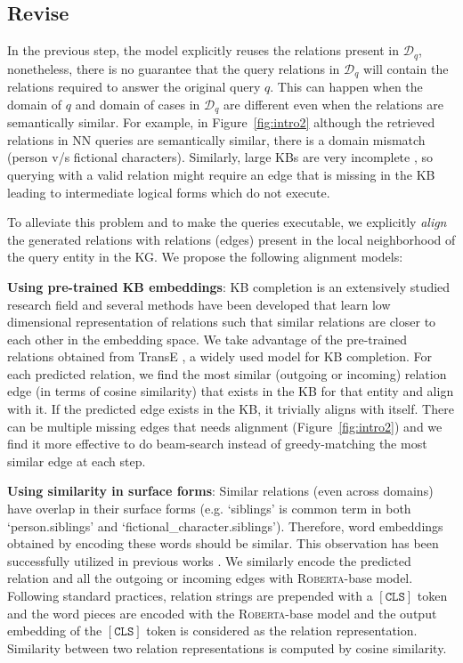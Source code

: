 \documentclass[11pt]{article}
\newcommand{\roberta}{\textsc{Roberta}\xspace}
\begin{document}
\subsection{Revise}
\label{sub:revise}

In the previous step, the model explicitly reuses the relations present in $\mathcal{D}_q$, nonetheless, there is no guarantee that the query relations in $\mathcal{D}_q$ will contain the relations required to answer the original query $q$. 
This can happen when the domain of $q$ and domain of cases in $\mathcal{D}_q$ are different even when  the relations are semantically similar.  For example, in Figure~\ref{fig:intro2} although the retrieved relations in NN queries are semantically similar, there is a domain mismatch (person v/s fictional characters). Similarly, large KBs are very incomplete \cite{min2013distant}, so querying with a valid relation might require an edge that is missing in the KB leading to intermediate logical forms which do not execute.



To alleviate this problem and to make the queries executable, we explicitly \emph{align} the generated relations with relations (edges) present in the local neighborhood of the query entity in the KG. We propose the following alignment models:

\textbf{Using pre-trained KB embeddings}: KB completion is an extensively studied research field \cite{nickel2011three,bordes2013translating,socher2013reasoning,Velickovic2018GraphAN,sun2019rotate} and several methods have been developed that learn low dimensional representation of relations such that similar relations are closer to each other in the embedding space. We take advantage of the pre-trained relations obtained from TransE \cite{bordes2013translating}, a widely used model for KB completion. For each predicted relation, we find the most similar (outgoing or incoming) relation edge (in terms of cosine similarity) that exists in the KB for that entity and align with it. If the predicted edge exists in the KB, it trivially aligns with itself. There can be multiple missing edges that needs alignment (Figure~\ref{fig:intro2}) and we find it more effective to do beam-search instead of greedy-matching the most similar edge at each step.

\textbf{Using similarity in surface forms}: Similar relations (even across domains) have overlap in their surface forms (e.g. `siblings' is common term in both `person.siblings' and `fictional\_character.siblings'). Therefore, word embeddings obtained by encoding these words should be similar. This observation has been successfully utilized in previous works \cite{toutanova-chen-2015-observed,hwang2019comprehensive}. We similarly encode the predicted relation and all the outgoing or incoming edges with \roberta-base model. Following standard practices, relation strings are prepended with a $\mathtt{[CLS]}$ token and the word pieces are encoded with the \roberta-base model and the output embedding of the $\mathtt{[CLS]}$ token is considered as the relation representation. Similarity between two relation representations is computed by cosine similarity.
\end{document}
